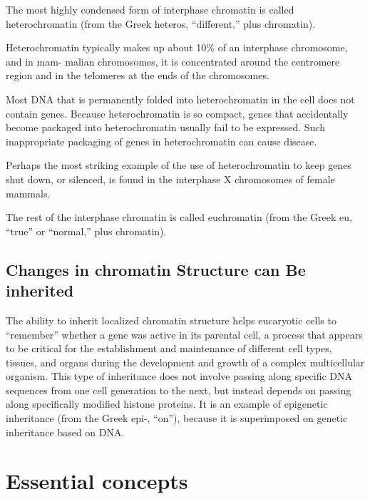 The most highly condensed form of interphase chromatin is called heterochromatin
(from the Greek heteros, “different,” plus chromatin).

Heterochromatin typically makes up about 10\% of an interphase chromosome, and in mam-
malian chromosomes, it is concentrated around the centromere region
and in the telomeres at the ends of the chromosomes.

Most DNA that is permanently folded into heterochromatin in the cell
does not contain genes. Because heterochromatin is so compact, genes
that accidentally become packaged into heterochromatin usually fail to
be expressed. Such inappropriate packaging of genes in
heterochromatin can cause disease.

Perhaps the most striking example of the use of heterochromatin to keep
genes shut down, or silenced, is found in the interphase X chromosomes of
female mammals.

The rest of the interphase chromatin is called euchromatin (from the
Greek eu, “true” or “normal,” plus chromatin).

\subsection{Changes in chromatin Structure can Be inherited}

The ability to inherit localized chromatin structure helps eucaryotic cells
to “remember” whether a gene was active in its parental cell, a process
that appears to be critical for the establishment and maintenance of different
cell types, tissues, and organs during the development and growth
of a complex multicellular organism. This type of inheritance does not
involve passing along specific DNA sequences from one cell generation to
the next, but instead depends on passing along specifically modified histone
proteins. It is an example of epigenetic inheritance (from the Greek
epi-, “on”), because it is superimposed on genetic inheritance based on
DNA.

\section{Essential concepts}

